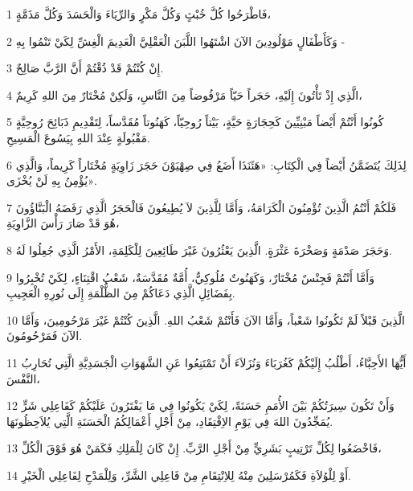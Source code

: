 \par 1 فَاطْرَحُوا كُلَّ خُبْثٍ وَكُلَّ مَكْرٍ وَالرِّيَاءَ وَالْحَسَدَ وَكُلَّ مَذَمَّةٍ،
\par 2 وَكَأَطْفَالٍ مَوْلُودِينَ الآنَ اشْتَهُوا اللَّبَنَ الْعَقْلِيَّ الْعَدِيمَ الْغِشِّ لِكَيْ تَنْمُوا بِهِ -
\par 3 إِنْ كُنْتُمْ قَدْ ذُقْتُمْ أَنَّ الرَّبَّ صَالِحٌ.
\par 4 الَّذِي إِذْ تَأْتُونَ إِلَيْهِ، حَجَراً حَيّاً مَرْفُوضاً مِنَ النَّاسِ، وَلَكِنْ مُخْتَارٌ مِنَ اللهِ كَرِيمٌ،
\par 5 كُونُوا أَنْتُمْ أَيْضاً مَبْنِيِّينَ كَحِجَارَةٍ حَيَّةٍ، بَيْتاً رُوحِيّاً، كَهَنُوتاً مُقَدَّساً، لِتَقْدِيمِ ذَبَائِحَ رُوحِيَّةٍ مَقْبُولَةٍ عِنْدَ اللهِ بِيَسُوعَ الْمَسِيحِ.
\par 6 لِذَلِكَ يُتَضَمَّنُ أَيْضاً فِي الْكِتَابِ: «هَئَنَذَا أَضَعُ فِي صِهْيَوْنَ حَجَرَ زَاوِيَةٍ مُخْتَاراً كَرِيماً، وَالَّذِي يُؤْمِنُ بِهِ لَنْ يُخْزَى».
\par 7 فَلَكُمْ أَنْتُمُ الَّذِينَ تُؤْمِنُونَ الْكَرَامَةُ، وَأَمَّا لِلَّذِينَ لاَ يُطِيعُونَ فَالْحَجَرُ الَّذِي رَفَضَهُ الْبَنَّاؤُونَ هُوَ قَدْ صَارَ رَأْسَ الزَّاوِيَةِ،
\par 8 وَحَجَرَ صَدْمَةٍ وَصَخْرَةَ عَثْرَةٍ. الَّذِينَ يَعْثُرُونَ غَيْرَ طَائِعِينَ لِلْكَلِمَةِ، الأَمْرُ الَّذِي جُعِلُوا لَهُ.
\par 9 وَأَمَّا أَنْتُمْ فَجِنْسٌ مُخْتَارٌ، وَكَهَنُوتٌ مُلُوكِيٌّ، أُمَّةٌ مُقَدَّسَةٌ، شَعْبُ اقْتِنَاءٍ، لِكَيْ تُخْبِرُوا بِفَضَائِلِ الَّذِي دَعَاكُمْ مِنَ الظُّلْمَةِ إِلَى نُورِهِ الْعَجِيبِ.
\par 10 الَّذِينَ قَبْلاً لَمْ تَكُونُوا شَعْباً، وَأَمَّا الآنَ فَأَنْتُمْ شَعْبُ اللهِ. الَّذِينَ كُنْتُمْ غَيْرَ مَرْحُومِينَ، وَأَمَّا الآنَ فَمَرْحُومُونَ.
\par 11 أَيُّهَا الأَحِبَّاءُ، أَطْلُبُ إِلَيْكُمْ كَغُرَبَاءَ وَنُزَلاَءَ أَنْ تَمْتَنِعُوا عَنِ الشَّهَوَاتِ الْجَسَدِيَّةِ الَّتِي تُحَارِبُ النَّفْسَ،
\par 12 وَأَنْ تَكُونَ سِيرَتُكُمْ بَيْنَ الأُمَمِ حَسَنَةً، لِكَيْ يَكُونُوا فِي مَا يَفْتَرُونَ عَلَيْكُمْ كَفَاعِلِي شَرٍّ يُمَجِّدُونَ اللهَ فِي يَوْمِ الاِفْتِقَادِ، مِنْ أَجْلِ أَعْمَالِكُمُ الْحَسَنَةِ الَّتِي يُلاَحِظُونَهَا.
\par 13 فَاخْضَعُوا لِكُلِّ تَرْتِيبٍ بَشَرِيٍّ مِنْ أَجْلِ الرَّبِّ. إِنْ كَانَ لِلْمَلِكِ فَكَمَنْ هُوَ فَوْقَ الْكُلِّ،
\par 14 أَوْ لِلْوُلاَةِ فَكَمُرْسَلِينَ مِنْهُ لِلاِنْتِقَامِ مِنْ فَاعِلِي الشَّرِّ، وَلِلْمَدْحِ لِفَاعِلِي الْخَيْرِ.
